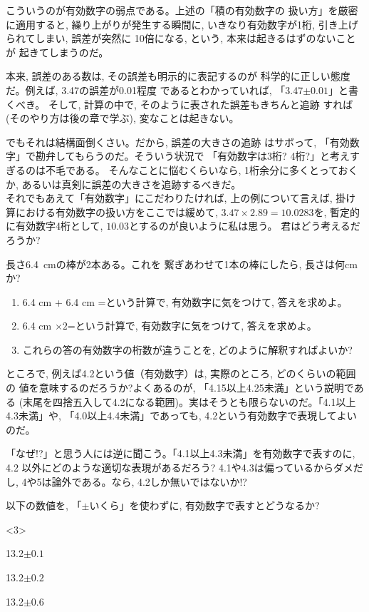 こういうのが有効数字の弱点である。上述の「積の有効数字の
扱い方」を厳密に適用すると, 繰り上がりが発生する瞬間に, 
いきなり有効数字が1桁, 引き上げられてしまい, 誤差が突然に
10倍になる, という, 本来は起きるはずのないことが
起きてしまうのだ。

本来, 誤差のある数は, その誤差も明示的に表記するのが
科学的に正しい態度だ。例えば, 3.47の誤差が0.01程度
であるとわかっていれば, 「3.47$\pm0.01$」と書くべき。
そして, 計算の中で, そのように表された誤差もきちんと追跡
すれば(そのやり方は後の章で学ぶ), 変なことは起きない。

でもそれは結構面倒くさい。だから, 誤差の大きさの追跡
はサボって, 「有効数字」で勘弁してもらうのだ。そういう状況で
「有効数字は3桁? 4桁?」と考えすぎるのは不毛である。
そんなことに悩むくらいなら, 1桁余分に多くとっておくか, 
あるいは真剣に誤差の大きさを追跡するべきだ。\\

それでもあえて「有効数字」にこだわりたければ, 上の例について言えば, 
掛け算における有効数字の扱い方をここでは緩めて, $3.47\times2.89=10.0283$を, 
暫定的に有効数字4桁として, $10.03$とするのが良いように私は思う。
君はどう考えるだろうか?\\


\begin{q}\label{q:guard_digit_8} 長さ6.4~cmの棒が2本ある。これを
繋ぎあわせて1本の棒にしたら, 長さは何cmか?
\begin{enumerate}
\item 6.4 cm + 6.4 cm =という計算で, 有効数字に気をつけて, 答えを求めよ。
\item 6.4 cm $\times 2$=という計算で, 有効数字に気をつけて, 答えを求めよ。
\item これらの答の有効数字の桁数が違うことを, どのように解釈すればよいか?
\end{enumerate}
\end{q}

ところで, 例えば4.2という値（有効数字）は, 実際のところ, どのくらいの範囲の
値を意味するのだろうか?よくあるのが, 「4.15以上4.25未満」という説明である
(末尾を四捨五入して4.2になる範囲)。実はそうとも限らないのだ。「4.1以上4.3未満」や, 
「4.0以上4.4未満」であっても, 4.2という有効数字で表現してよいのだ。

「なぜ!?」と思う人には逆に聞こう。「4.1以上4.3未満」を有効数字で表すのに, 4.2
以外にどのような適切な表現があるだろう? 4.1や4.3は偏っているからダメだし, 
4や5は論外である。なら, 4.2しか無いではないか!?

\begin{q}\label{q:guard_digit_9} 以下の数値を, 「$\pm$いくら」を使わずに, 
有効数字で表すとどうなるか?
\begin{edaenumerate}<3>
\item 13.2$\pm 0.1$
\item 13.2$\pm 0.2$
\item 13.2$\pm 0.6$
\end{edaenumerate}
\end{q}

